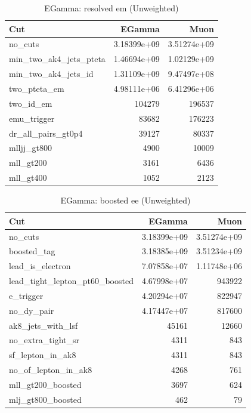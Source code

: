 \documentclass{article}
\begin{document}
\begin{table}[htbp]
\centering
\caption{EGamma: resolved em (Unweighted)}
\begin{tabular}{lrr}
\hline
Cut & EGamma & Muon \\
\hline
no\_cuts & 3.18399e+09 & 3.51274e+09 \\
min\_two\_ak4\_jets\_pteta & 1.46694e+09 & 1.02129e+09 \\
min\_two\_ak4\_jets\_id & 1.31109e+09 & 9.47497e+08 \\
two\_pteta\_em & 4.98111e+06 & 6.41296e+06 \\
two\_id\_em & 104279 & 196537 \\
emu\_trigger & 83682 & 176223 \\
dr\_all\_pairs\_gt0p4 & 39127 & 80337 \\
mlljj\_gt800 & 4900 & 10009 \\
mll\_gt200 & 3161 & 6436 \\
mll\_gt400 & 1052 & 2123 \\
\hline
\end{tabular}
\end{table}

\begin{table}[htbp]
\centering
\caption{EGamma: boosted ee (Unweighted)}
\begin{tabular}{lrr}
\hline
Cut & EGamma & Muon \\
\hline
no\_cuts & 3.18399e+09 & 3.51274e+09 \\
boosted\_tag & 3.18385e+09 & 3.51234e+09 \\
lead\_is\_electron & 7.07858e+07 & 1.11748e+06 \\
lead\_tight\_lepton\_pt60\_boosted & 4.67998e+07 & 943922 \\
e\_trigger & 4.20294e+07 & 822947 \\
no\_dy\_pair & 4.17447e+07 & 817600 \\
ak8\_jets\_with\_lsf & 45161 & 12660 \\
no\_extra\_tight\_sr & 4311 & 843 \\
sf\_lepton\_in\_ak8 & 4311 & 843 \\
no\_of\_lepton\_in\_ak8 & 4268 & 761 \\
mll\_gt200\_boosted & 3697 & 624 \\
mlj\_gt800\_boosted & 462 & 79 \\
\hline
\end{tabular}
\end{table}
\end{document}
